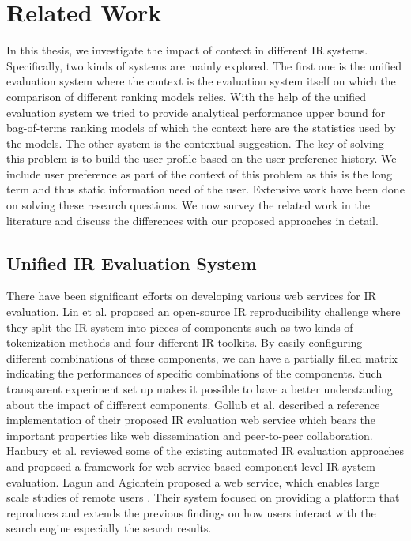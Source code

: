 %
%
\chapter{Related Work}

In this thesis, we investigate the impact of context in different IR systems. 
Specifically, two kinds of systems are mainly explored. 
The first one is the unified evaluation system where the context is the 
evaluation system itself on which the comparison of different ranking models 
relies. With the help of the unified evaluation system we tried to 
provide analytical performance upper bound for bag-of-terms ranking models 
of which the context here are the statistics used by the models. 
The other system is the contextual suggestion. The key of solving this 
problem is to build the user profile based on the user preference history. 
We include user preference as part of the context of this problem as 
this is the long term and thus static information need of the user.
Extensive work have been done on solving these research questions. 
We now survey the related work in the literature and discuss the differences
with our proposed approaches in detail.


\section{Unified IR Evaluation System}

There have been significant efforts on developing various web 
services for IR evaluation. 
Lin et al. \cite{conf/ecir/LinCTCCFIMV16} proposed an open-source 
IR reproducibility challenge where they split the IR system into 
pieces of components such as two kinds of tokenization methods and 
four different IR toolkits. 
By easily configuring different combinations of these components, we 
can have a partially filled matrix indicating the performances of 
specific combinations of the components. Such transparent 
experiment set up makes it possible to have a better understanding about 
the impact of different components. 
Gollub et al. \cite{Gollub:2012:OIT:2348283.2348501} described a reference 
implementation of their proposed IR evaluation web service which bears 
the important properties like web dissemination and peer-to-peer 
collaboration. 
Hanbury et al. \cite{Hanbury:2010:ACE:1889174.1889194} reviewed some 
of the existing automated IR evaluation approaches and proposed a 
framework for web service based component-level IR system evaluation. 
Lagun and Agichtein proposed a web service, which enables large scale 
studies of remote users \cite{Lagun:2011:VEL:2009916.2009967}. 
Their system focused on providing a platform that reproduces and 
extends the previous findings on how users interact with the 
search engine especially the search results. 

